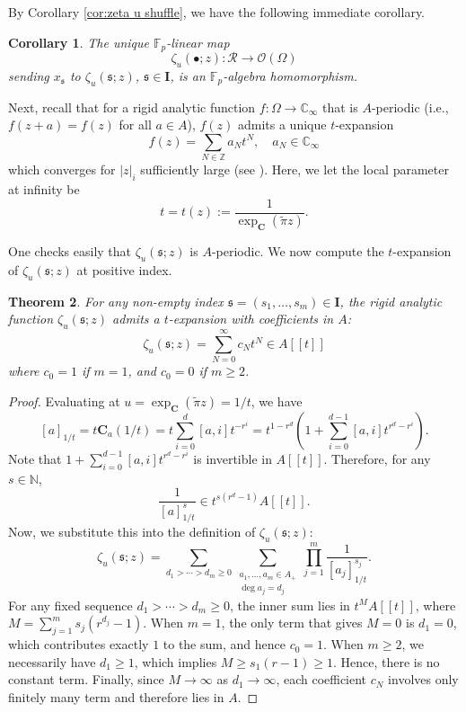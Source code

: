 \documentclass[12pt,reqno]{amsart}
\numberwithin{equation}{section}
\theoremstyle{plain}
\newtheorem{thm}{Theorem}[section]
\newtheorem{cor}[thm]{Corollary}
\theoremstyle{definition}
\theoremstyle{remark}
\newcommand{\ZZ}{\mathbb{Z}}
\newcommand{\NN}{\mathbb{N}}
\newcommand{\CC}{\mathbb{C}}
\newcommand{\FF}{\mathbb{F}}
\newcommand{\Ocal}{\mathcal{O}}
\newcommand{\Rcal}{\mathcal{R}}
\newcommand{\cpi}{\tilde{\pi}}
\newcommand{\ww}[1]{\mathfrak{#1}}
\newcommand{\C}{\mathbf{C}}
\newcommand{\Ical}{\mathbf{I}}
\begin{document}
By Corollary \ref{cor:zeta u shuffle}, we have the following immediate corollary. 
\begin{cor}
  The unique $\FF_p$-linear map
$$\zeta_u(\bullet;z):\Rcal\to \Ocal(\Omega)$$  
sending $x_{\ww{s}}$ to $\zeta_u(\ww{s};z)$, $\ww{s}\in\Ical$, is an $\FF_p$-algebra homomorphism.
\end{cor}


Next, recall that for a rigid analytic function $f: \Omega \to \CC_\infty$ that is $A$-periodic (i.e., $f(z+a) = f(z)$ for all $a \in A$), $f(z)$ admits a unique $t$-expansion
$$ f(z) = \sum_{N \in \ZZ} a_N t^N,\quad a_N\in\CC_\infty$$
which converges for $|z|_i$ sufficiently large (see \cite{Goss1980a}). Here, we let the local parameter at infinity be
$$ t = t(z) := \frac{1}{\exp_\C(\cpi z)}. $$

One checks easily that $\zeta_u(\ww{s};z)$ is $A$-periodic. We now compute the $t$-expansion of $\zeta_u(\ww{s};z)$ at positive index.

\begin{thm}\label{thm:t_expansion}
    For any non-empty index $\ww{s}=(s_1,\ldots,s_m)\in\Ical$, the rigid analytic function $\zeta_u(\ww{s}; z)$ admits a $t$-expansion with coefficients in $A$:
    \[ \zeta_u(\ww{s}; z) = \sum_{N=0}^\infty c_N t^N \in A[[t]] \]
    where $c_0 = 1$ if $m=1$, and $c_0 = 0$ if $m \geq 2$. 
\end{thm}

\begin{proof}
     Evaluating at $u=\exp_\C(\cpi z)=1/t$, we have
    \[ [a]_{1/t} = t \C_a(1/t) = t \sum_{i=0}^d [a,i] t^{-r^i} = t^{1-r^d} \left( 1 + \sum_{i=0}^{d-1} [a,i] t^{r^d - r^i} \right). \]
    Note that $1 + \sum_{i=0}^{d-1} [a,i] t^{r^d - r^i}$ is invertible in $A[[t]]$. Therefore, for any $s\in\NN$, 
    \[ \frac{1}{[a]_{1/t}^s} \in t^{s(r^d-1)} A[[t]]. \]
    Now, we substitute this into the definition of $\zeta_u(\ww{s}; z)$:
    \[ \zeta_u(\ww{s}; z) = \sum_{d_1 > \cdots > d_m \geq 0} \sum_{\substack{a_1, \ldots, a_m \in A_+ \\ \deg a_j = d_j}} \prod_{j=1}^m \frac{1}{[a_j]_{1/t}^{s_j}}. \]
    For any fixed sequence $d_1 > \cdots > d_m \geq 0$, the inner sum lies in $t^M A[[t]]$, where $M = \sum_{j=1}^m s_j (r^{d_j}-1)$. When $m=1$, the only term that gives $M=0$ is $d_1=0$, which contributes exactly $1$ to the sum, and hence $c_0=1$. When $m \ge 2$, we necessarily have $d_1 \ge 1$, which implies $M \ge s_1(r-1) \ge 1$. Hence, there is no constant term. Finally, since $M \to \infty$ as $d_1 \to \infty$, each coefficient $c_N$ involves only finitely many term and therefore lies in $A$.
\end{proof}
\end{document}
